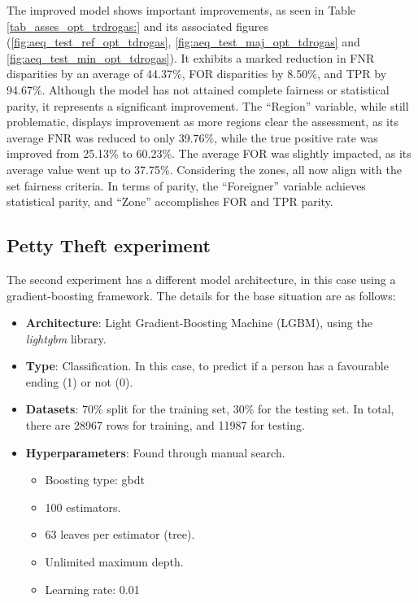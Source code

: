 \documentclass[twoside,11pt]{article}
\begin{document}
The improved model shows important improvements, as seen in Table \ref{tab_asses_opt_trdrogas:} and its associated figures (\ref{fig:aeq_test_ref_opt_tdrogas}, \ref{fig:aeq_test_maj_opt_tdrogas} and \ref{fig:aeq_test_min_opt_tdrogas}). It exhibits a marked reduction in FNR disparities by an average of 44.37\%, FOR disparities by 8.50\%, and TPR by 94.67\%. Although the model has not attained complete fairness or statistical parity, it represents a significant improvement. The ``Region'' variable, while still problematic, displays improvement as more regions clear the assessment, as its average FNR was reduced to only 39.76\%, while the true positive rate was improved from 25.13\% to 60.23\%. The average FOR was slightly impacted, as its average value went up to 37.75\%. Considering the zones, all now align with the set fairness criteria. In terms of parity, the ``Foreigner'' variable achieves statistical parity, and ``Zone'' accomplishes FOR and TPR parity.


\subsection{Petty Theft experiment}

The second experiment has a different model architecture, in this case using a gradient-boosting framework. The details for the base situation are as follows:

\begin{itemize}
    \item \textbf{Architecture}: Light Gradient-Boosting Machine (LGBM), using the \textit{lightgbm} library.
    \item \textbf{Type}: Classification. In this case, to predict if a person has a favourable ending (1) or not (0).
    \item \textbf{Datasets}: 70\% split for the training set, 30\% for the testing set. In total, there are 28967 rows for training, and 11987 for testing.
    \item \textbf{Hyperparameters}: Found through manual search.
        \begin{itemize}
            \item Boosting type: gbdt
            \item 100 estimators.
            \item 63 leaves per estimator (tree).
            \item Unlimited maximum depth.
            \item Learning rate: 0.01
        \end{itemize}
\end{itemize}
\end{document}
